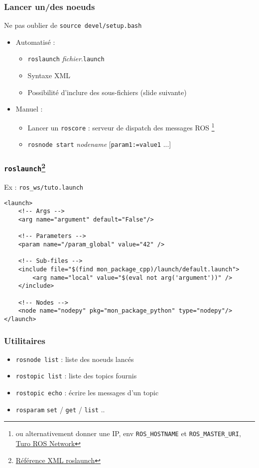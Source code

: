 \documentclass{beamer}
\begin{document}
\begin{frame}
\frametitle{Lancer un/des noeuds}
Ne pas oublier de \texttt{source devel/setup.bash}
\begin{itemize}
    \item Automatisé : \begin{itemize}
        \item \texttt{roslaunch} \textit{fichier}.\texttt{launch}
        \item Syntaxe XML
        \item Possibilité d'inclure des sous-fichiers (slide suivante)
    \end{itemize}
    \item Manuel : \begin{itemize}
        \item Lancer un \texttt{roscore} : serveur de dispatch des messages ROS \footnote{ou
        alternativement donner une IP, env \texttt{ROS\_HOSTNAME} et \texttt{ROS\_MASTER\_URI},
        \href{http://wiki.ros.org/ROS/NetworkSetup}{Turo ROS Network}}
        \item \texttt{rosnode start} \textit{nodename} [\texttt{param1:=value1} ...]
    \end{itemize}
\end{itemize}
\end{frame}

\begin{frame}[fragile]
\frametitle{\texttt{roslaunch}\footnote{\href{http://wiki.ros.org/roslaunch/XML
}{Référence XML roslaunch}}}
Ex : \texttt{ros\_ws/tuto.launch}

\begin{verbatim}
<launch>
    <!-- Args -->
    <arg name="argument" default="False"/>

    <!-- Parameters -->
    <param name="/param_global" value="42" />

    <!-- Sub-files -->
    <include file="$(find mon_package_cpp)/launch/default.launch">
        <arg name="local" value="$(eval not arg('argument'))" />
    </include>

    <!-- Nodes -->
    <node name="nodepy" pkg="mon_package_python" type="nodepy"/>
</launch>
\end{verbatim}
\end{frame}


\begin{frame}
\frametitle{Utilitaires}
\begin{itemize}
    \item \texttt{rosnode list} : liste des noeuds lancés
    \item \texttt{rostopic list} : liste des topics fournis
    \item \texttt{rostopic echo} : écrire les messages d'un topic
    \item \texttt{rosparam} \texttt{set} / \texttt{get} / \texttt{list} ..
\end{itemize}
\end{frame}
\end{document}
